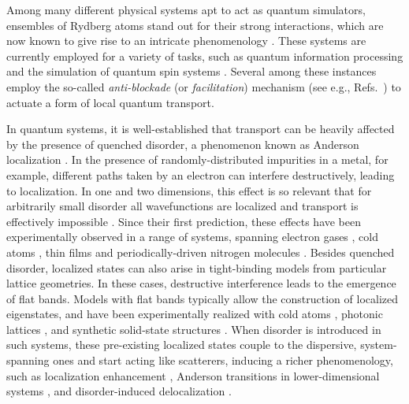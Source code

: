\documentclass[prl,aps,twocolumn,showpacs,superscriptaddress,longbibliography]{revtex4-1}
\begin{document}
Among many different physical systems apt to act as quantum simulators, ensembles of Rydberg atoms \cite{a_Saffman_RMP_10, Low_2012, Gallagher_1994} stand out for their strong interactions, which are now known to give rise to an intricate phenomenology \cite{Weimer2010, Lan2016, Levi2016, Lan2015, Schempp2014, Schauss_2015, Low2009, Sibalic2016, Carr2013, Marcuzzi2014, Gutierrez2015}. These systems are currently employed for a variety of tasks, such as quantum information processing \cite{Jaksch2000,Weimer_2010,Saffman_2016} and the simulation of quantum spin systems \cite{Labuhn_2015, Schauss_2015}. Several among these instances employ the so-called \emph{anti-blockade} (or \emph{facilitation}) mechanism (see e.g., Refs.~\cite{Ates_2007,Amthor_2010,Garttner_2013,schonleber2014,Lesanovsky_2014,Urvoy_2015,Valado_2016}) to actuate a form of local quantum transport.



In quantum systems, it is well-established that transport can be heavily affected by the presence of quenched disorder, a phenomenon known as Anderson localization \cite{Anderson1958}. In the presence of randomly-distributed impurities in a metal, for example, different paths taken by an electron can interfere destructively, leading to localization. In one and two dimensions, this effect is so relevant that for arbitrarily small disorder all wavefunctions are localized and transport is effectively impossible \cite{Mott1961,Ishii1973}. Since their first prediction, these effects have been experimentally observed in a range of systems, spanning electron gases \cite{Cutler:1969}, cold atoms \cite{Billy:2008,Roati:2008,Semeghini:2015}, thin films \cite{Liao:2015} and periodically-driven nitrogen molecules \cite{Bitter:2016}. Besides quenched disorder, localized states can also arise in tight-binding models from particular lattice geometries. In these cases, destructive interference leads to the emergence of flat bands. Models with flat bands typically allow the construction of localized eigenstates, and have been experimentally realized with cold atoms \cite{Shen2010}, photonic lattices \cite{Mukherjee2015}, and synthetic solid-state structures \cite{slot2017, drost2017}. When disorder is introduced in such systems, these pre-existing localized states couple to the dispersive, system-spanning ones and start acting like scatterers, inducing a richer phenomenology, such as localization enhancement \cite{Leykam2017}, Anderson transitions in lower-dimensional systems \cite{Bodyfelt2014}, and disorder-induced delocalization \cite{Goda2006}.
\end{document}
